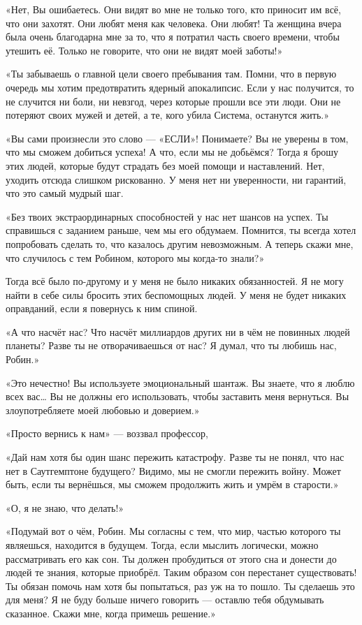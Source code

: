 \documentclass[a5paper, 9pt,
final, openany, twoside=true]{memoir}
\begin{document}
«Нет, Вы ошибаетесь. Они видят во мне не только того, кто приносит им всё, что они захотят. Они любят меня как человека. Они любят! Та женщина вчера была очень благодарна мне за то, что я потратил часть своего времени, чтобы утешить её. Только не говорите, что они не видят моей заботы!»

«Ты забываешь о главной цели своего пребывания там. Помни, что в первую очередь мы хотим предотвратить ядерный апокалипсис. Если у нас получится, то не случится ни боли, ни невзгод, через которые прошли все эти люди. Они не потеряют своих мужей и детей, а те, кого убила Система, останутся жить.»

«Вы сами произнесли это слово — «ЕСЛИ»! Понимаете? Вы не уверены в том, что мы сможем добиться успеха! А что, если мы не добьёмся? Тогда я брошу этих людей, которые будут страдать без моей помощи и наставлений. Нет, уходить отсюда слишком рискованно. У меня нет ни уверенности, ни гарантий, что это самый мудрый шаг.

«Без твоих экстраординарных способностей у нас нет шансов на успех. Ты справишься с заданием раньше, чем мы его обдумаем. Помнится, ты всегда хотел попробовать сделать то, что казалось другим невозможным. А теперь скажи мне, что случилось с тем Робином, которого мы когда-то знали?»

Тогда всё было по-другому и у меня не было никаких обязанностей. Я не могу найти в себе силы бросить этих беспомощных людей. У меня не будет никаких оправданий, если я повернусь к ним спиной.

«А что насчёт нас? Что насчёт миллиардов других ни в чём не повинных людей планеты? Разве ты не отворачиваешься от нас? Я думал, что ты любишь нас, Робин.»

«Это нечестно! Вы используете эмоциональный шантаж. Вы знаете, что я люблю всех вас… Вы не должны его использовать, чтобы заставить меня вернуться. Вы злоупотребляете моей любовью и доверием.»

«Просто вернись к нам» — воззвал профессор,

«Дай нам хотя бы один шанс пережить катастрофу. Разве ты не понял, что нас нет в Саутгемптоне будущего? Видимо, мы не смогли пережить войну. Может быть, если ты вернёшься, мы сможем продолжить жить и умрём в старости.»

«О, я не знаю, что делать!»

«Подумай вот о чём, Робин. Мы согласны с тем, что мир, частью которого ты являешься, находится в будущем. Тогда, если мыслить логически, можно рассматривать его как сон. Ты должен пробудиться от этого сна и донести до людей те знания, которые приобрёл. Таким образом сон перестанет существовать! Ты обязан помочь нам хотя бы попытаться, раз уж на то пошло. Ты сделаешь это для меня? Я не буду больше ничего говорить — оставлю тебя обдумывать сказанное. Скажи мне, когда примешь решение.»
\end{document}
